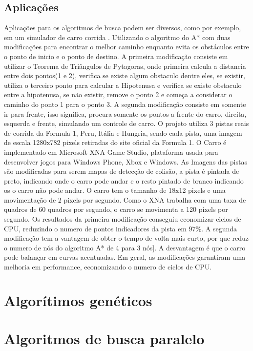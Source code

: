 \subsection{Aplicações}
Aplicações para os algoritmos de busca podem ser diversos, como por exemplo, em um simulador de carro corrida \cite{JungTing}. Utilizando o algoritmo do A* com duas modificações para encontrar o melhor caminho enquanto evita os obstáculos entre o ponto de inicio e o ponto de destino. 
A primeira modificação consiste em utilizar o Teorema de Triângulos de Pytagoras, onde primeira calcula a distancia entre dois pontos(1 e 2), verifica se existe algum obstaculo dentre eles, se existir, utiliza o terceiro ponto para calcular a Hipotenusa e verifica se existe obstaculo entre a hipotenusa, se não existir, remove o ponto 2 e começa a considerar o caminho do ponto 1 para o ponto 3. A segunda modificação consiste em somente ir para frente, isso significa, procura somente os pontos a frente do carro, direita, esquerda e frente, simulando um controle de carro.
O projeto utiliza 3 pistas reais de corrida da Formula 1, Peru, Itália e Hungria, sendo cada pista, uma imagem de escala 1280x782 pixels retiradas do site oficial da Formula 1. O Carro é implementado em Microsoft XNA Game Studio, plataforma usada para desenvolver jogos para Windows Phone, Xbox e Windows. As Imagens das pistas são modificadas para serem mapas de detecção de colisão, a pista é pintada de preto, indicando onde o carro pode andar e o resto pintado de branco indicando os o carro não pode andar. O carro tem o tamanho de 18x12 pixels e uma movimentação de 2 pixels por segundo. Como o XNA trabalha com uma taxa de quadros de 60 quadros por segundo, o carro se movimenta a 120 pixels por segundo.
Os resultados da primeira modificação conseguiu economizar ciclos de CPU, reduzindo o numero de pontos indicadores da pista em 97\%. A segunda modificação tem a vantagem de obter o tempo de volta mais curto, por que reduz o numero de nós do algoritmo A* de 4 para 3 nós]. A desvantagem é que o carro pode balançar em curvas acentuadas. Em geral, as modificações garantiram uma melhoria em performance, economizando o numero de ciclos de CPU.

\section{Algorítimos genéticos}

\section{Algoritmos de busca paralelo}

